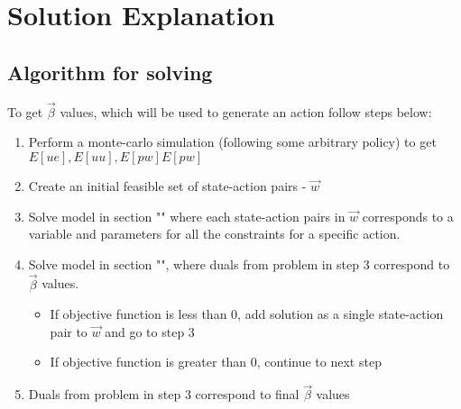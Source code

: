 \documentclass{article}
\begin{document}
\section{Solution Explanation}
\subsection{Algorithm for solving}
To get $\vec{\beta}$ values, which will be used to generate an action follow steps below:
\begin{enumerate}
	\item Perform a monte-carlo simulation (following some arbitrary policy) to get $E[ue], E[uu], E[pw] E[pw]$
	\item Create an initial feasible set of state-action pairs - $\vec{w}$
	\item Solve model in section "" where each state-action pairs in $\vec{w}$ corresponds to a variable and parameters for all the constraints for a specific action.
	\item Solve model in section "", where duals from problem in step 3  correspond to $\vec{\beta}$ values. 
		\begin{itemize}
			\item If objective function is less than 0, add solution as a single state-action pair to $\vec{w}$ and go to step 3
			\item If objective function is greater than 0, continue to next step
		\end{itemize}
	\item Duals from problem in step 3 correspond to final $\vec{\beta}$ values
\end{enumerate}
	
\end{document}
